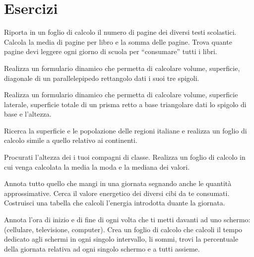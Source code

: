 \section{Esercizi}
\label{05_01_f_di_calc:esercizi}

\begin{esercizio}
Riporta in un foglio di calcolo il numero di pagine dei diversi testi
scolastici. Calcola la media di pagine per libro e la somma delle pagine.
Trova quante pagine devi leggere ogni giorno di scuola per
``consumare'' tutti i libri.
\end{esercizio}

\begin{esercizio}
Realizza un formulario dinamico che permetta di calcolare volume,
superficie, diagonale di un parallelepipedo rettangolo
dati i suoi tre spigoli.
\end{esercizio}

\begin{esercizio}
Realizza un formulario dinamico che permetta di calcolare volume,
superficie laterale, superficie totale di un prisma retto a base
triangolare
dati lo spigolo di base e l'altezza.
\end{esercizio}

\begin{esercizio}
Ricerca la superficie e le popolazione delle regioni italiane e realizza
un foglio di calcolo simile a quello relativo ai continenti.
\end{esercizio}

\begin{esercizio}
Procurati l'altezza dei i tuoi compagni di classe. Realizza un
foglio di calcolo in cui venga calcolata la media la moda e la mediana
dei valori.
\end{esercizio}

\begin{esercizio}
Annota tutto quello che mangi in una giornata segnando anche le quantità
approssimative. Cerca il valore energetico dei diversi cibi da te
consumati. Costruisci una tabella che calcoli l'energia introdotta
duante la giornata.
\end{esercizio}

\begin{esercizio}
Annota l'ora di inizio e di fine di ogni volta che ti metti davanti ad
uno schermo: (cellulare, televisione, computer).
Crea un foglio di calcolo che calcoli il tempo dedicato agli schermi in
ogni singolo intervallo, li sommi, trovi la percentuale della giornata
relativa ad ogni singolo schermo e a tutti assieme.
\end{esercizio}

